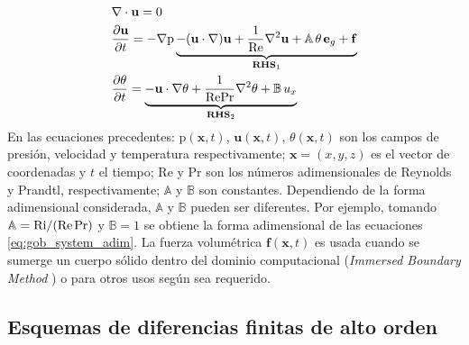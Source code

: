 \begin{equation}
\begin{aligned}
&\nabla \cdot \mathbf{u} = 0 \\
& \frac{\partial \mathbf{u}}{\partial t} = -\nabla \text{p} \underbrace{- (\mathbf{u} \cdot \nabla)\mathbf{u} + \frac{1}{\text{Re}} \nabla^2 \mathbf{u} + \mathbb{A} \hspace{0.5mm} \theta \hspace{0.5mm} \mathbf{e}_g + \mathbf{f} }_{\textbf{RHS}_{1}} \\
& \frac{\partial \theta}{\partial t} = \underbrace{- \mathbf{u} \cdot \nabla \theta + \frac{1}{\text{Re} \text{Pr}} \nabla^2 \theta + \mathbb{B} \hspace{0.5mm} u_x }_{\textbf{RHS}_2} \\
\end{aligned}
\label{eq:sistem2}
\end{equation}
En las ecuaciones precedentes: $\text{p}(\mathbf{x},t)$, $\mathbf{u}(\mathbf{x},t)$, $\theta(\mathbf{x},t)$
son los campos de presión, velocidad y temperatura respectivamente; $\mathbf{x} = (x,y,z)$ es el vector de coordenadas y $t$ el tiempo; Re y Pr son los números adimensionales de Reynolds y Prandtl, respectivamente; $\mathbb{A}$ y $\mathbb{B}$ son constantes. Dependiendo de la forma adimensional considerada, $\mathbb{A}$ y $\mathbb{B}$ pueden ser diferentes. Por ejemplo, tomando $\mathbb{A}=\text{Ri} / (\text{Re} \hspace{0.5mm} \text{Pr})$ y $\mathbb{B}=1$  se obtiene la forma adimensional de las ecuaciones \ref{eq:gob_system_adim}. La fuerza volumétrica $\mathbf{f}(\mathbf{x},t)$ es usada cuando se sumerge un cuerpo sólido dentro del dominio computacional (\textit{Immersed Boundary Method} \cite{peskin2002immersed}) o para otros usos según sea requerido.


\subsection{Esquemas de diferencias finitas de alto orden}

